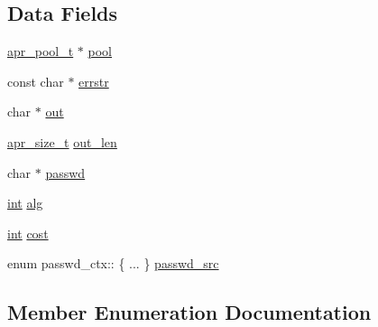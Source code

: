 \subsection*{Data Fields}
\begin{DoxyCompactItemize}
\item 
\hyperlink{structapr__pool__t}{apr\+\_\+pool\+\_\+t} $\ast$ \hyperlink{structpasswd__ctx_abdb187a35f5be5af2bf82ef3363dc11b}{pool}
\item 
const char $\ast$ \hyperlink{structpasswd__ctx_ac138b422f243f942d99385910e813777}{errstr}
\item 
char $\ast$ \hyperlink{structpasswd__ctx_a08a570cfa3f0a660479b64ec4a08d4b7}{out}
\item 
\hyperlink{group__apr__platform_gaaa72b2253f6f3032cefea5712a27540e}{apr\+\_\+size\+\_\+t} \hyperlink{structpasswd__ctx_a0cf82260a607c15384cfd8a98aeace9b}{out\+\_\+len}
\item 
char $\ast$ \hyperlink{structpasswd__ctx_a6be10f01e77b32b5a28c2fb08604c46c}{passwd}
\item 
\hyperlink{pcre_8txt_a42dfa4ff673c82d8efe7144098fbc198}{int} \hyperlink{structpasswd__ctx_a6f535584596964c51f398f1728b25c71}{alg}
\item 
\hyperlink{pcre_8txt_a42dfa4ff673c82d8efe7144098fbc198}{int} \hyperlink{structpasswd__ctx_a54f34c48127cd3c115a7fa2fb23a089a}{cost}
\item 
enum passwd\+\_\+ctx\+:: \{ ... \}  \hyperlink{structpasswd__ctx_af434e862f6290b980533858aa7627c99}{passwd\+\_\+src}
\end{DoxyCompactItemize}


\subsection{Member Enumeration Documentation}
